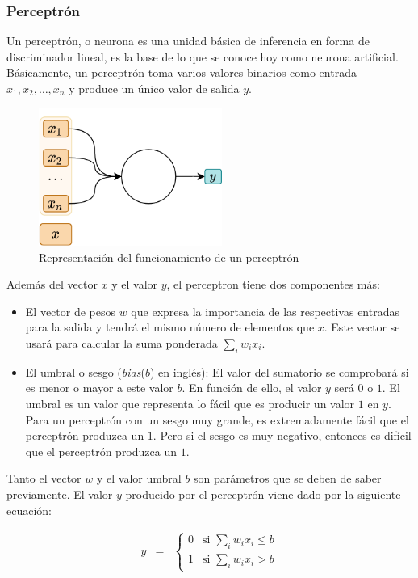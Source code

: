 \subsubsection{Perceptrón}
Un perceptrón, o neurona es una unidad básica de inferencia en forma de discriminador lineal, es la base de lo que se conoce hoy como neurona artificial\cite{nielsen}. Básicamente, un perceptrón toma varios valores binarios como entrada $x_1, x_2, …, x_n$ y produce un único valor de salida $y$.
\newline

\begin{figure}[H]
    \centering
    \includegraphics[width=6cm]{images/state-of-art/perceptron/perceptron.png}
    \caption{Representación del funcionamiento de un perceptrón}
    \label{fig:perceptronprocess}
\end{figure}

Además del vector $x$ y el valor $y$, el perceptron tiene dos componentes más: 
\begin{itemize}
    \item El vector de pesos $w$ que expresa la importancia de las respectivas entradas para la salida y tendrá el mismo número de elementos que $x$. Este vector se usará para calcular la suma ponderada  $\sum_i w_ix_i$.
    \item El umbral o sesgo (\textit{bias}($b$) en inglés): El valor del sumatorio se comprobará si es menor o mayor a este valor $b$. En función de ello, el valor $y$ será $0$ o $1$. El umbral es un valor que representa lo fácil que es producir un valor $1$ en $y$. Para un perceptrón con un sesgo muy grande, es extremadamente fácil que el perceptrón produzca un $1$. Pero si el sesgo es muy negativo, entonces es difícil que el perceptrón produzca un $1$.
\end{itemize}

Tanto el vector $w$ y el valor umbral $b$ son parámetros que se deben de saber previamente. El valor $y$ producido por el perceptrón viene dado por la siguiente ecuación: 

\begin{eqnarray}
  y & = & \left\{ \begin{array}{ll}
      0 & \mbox{si } \sum_i w_i x_i \leq b \\
      1 & \mbox{si } \sum_i w_i x_i > b
      \end{array} \right.
      \label{eqn:perceptroncomplex}
\end{eqnarray}


